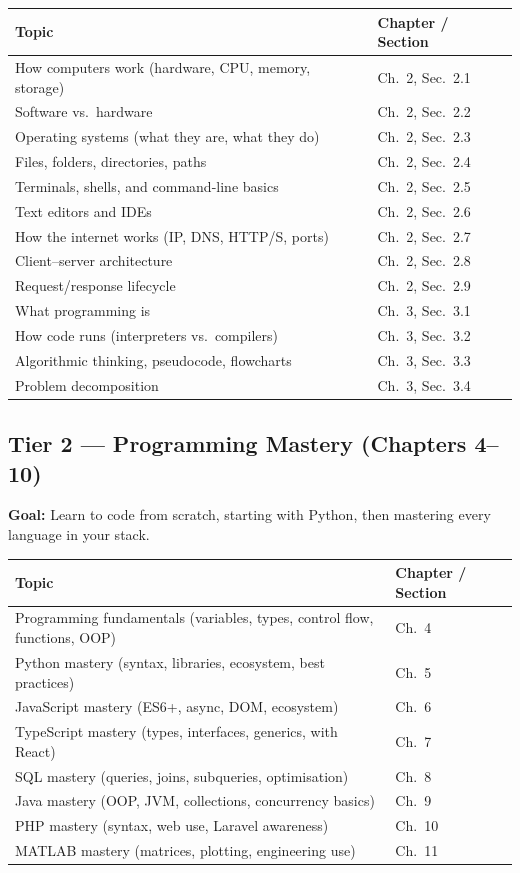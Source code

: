 \documentclass[12pt, a4paper, oneside]{book}
\begin{document}
\begin{longtable}{p{} p{}}
\toprule
\textbf{Topic} & \textbf{Chapter / Section} \\
\midrule
\endhead
How computers work (hardware, CPU, memory, storage) & Ch.\ 2, Sec.\ 2.1 \\
Software vs.\ hardware & Ch.\ 2, Sec.\ 2.2 \\
Operating systems (what they are, what they do) & Ch.\ 2, Sec.\ 2.3 \\
Files, folders, directories, paths & Ch.\ 2, Sec.\ 2.4 \\
Terminals, shells, and command-line basics & Ch.\ 2, Sec.\ 2.5 \\
Text editors and IDEs & Ch.\ 2, Sec.\ 2.6 \\
How the internet works (IP, DNS, HTTP/S, ports) & Ch.\ 2, Sec.\ 2.7 \\
Client--server architecture & Ch.\ 2, Sec.\ 2.8 \\
Request/response lifecycle & Ch.\ 2, Sec.\ 2.9 \\
What programming is & Ch.\ 3, Sec.\ 3.1 \\
How code runs (interpreters vs.\ compilers) & Ch.\ 3, Sec.\ 3.2 \\
Algorithmic thinking, pseudocode, flowcharts & Ch.\ 3, Sec.\ 3.3 \\
Problem decomposition & Ch.\ 3, Sec.\ 3.4 \\
\bottomrule
\end{longtable}

\subsection{Tier 2 — Programming Mastery (Chapters 4--10)}

\textbf{Goal:} Learn to code from scratch, starting with Python, then mastering every language in your stack.

\begin{longtable}{p{} p{}}
\toprule
\textbf{Topic} & \textbf{Chapter / Section} \\
\midrule
\endhead
Programming fundamentals (variables, types, control flow, functions, OOP) & Ch.\ 4 \\
Python mastery (syntax, libraries, ecosystem, best practices) & Ch.\ 5 \\
JavaScript mastery (ES6+, async, DOM, ecosystem) & Ch.\ 6 \\
TypeScript mastery (types, interfaces, generics, with React) & Ch.\ 7 \\
SQL mastery (queries, joins, subqueries, optimisation) & Ch.\ 8 \\
Java mastery (OOP, JVM, collections, concurrency basics) & Ch.\ 9 \\
PHP mastery (syntax, web use, Laravel awareness) & Ch.\ 10 \\
MATLAB mastery (matrices, plotting, engineering use) & Ch.\ 11 \\
\bottomrule
\end{longtable}
\end{document}
